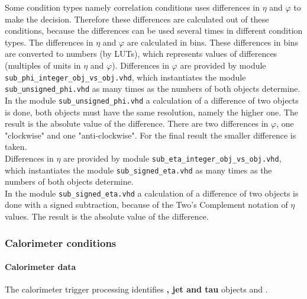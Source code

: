 Some condition types namely correlation conditions uses differences in $\eta$ and $\varphi$ to make the decision.
Therefore these differences are calculated out of these conditions, because the differences can be used several times in different condition types.
The differences in $\eta$ and $\varphi$ are calculated in bins. These differences in bins are converted to numbers (by LUTs),
which represents values of differences (multiples of units in $\eta$ and $\varphi$).
Differences in $\varphi$ are provided by module \texttt{sub\_phi\_integer\_obj\_vs\_obj.vhd}, which instantiates the module \texttt{sub\_unsigned\_phi.vhd} as many times as
the numbers of both objects determine.\\
In the module \texttt{sub\_unsigned\_phi.vhd} a calculation of a difference of two objects is done, both objects must have the same resolution, namely the higher one.
The result is the absolute value of the difference.
There are two differences in $\varphi$, one "clockwise" and one "anti-clockwise". For the final result the smaller difference is taken.\\
Differences in $\eta$ are provided by module \texttt{sub\_eta\_integer\_obj\_vs\_obj.vhd}, which instantiates the module \texttt{sub\_signed\_eta.vhd} as many times as
the numbers of both objects determine.\\
In the module \texttt{sub\_signed\_eta.vhd} a calculation of a difference of two objects is done with a signed subtraction, because of the Two's Complement notation of $\eta$ values.
The result is the absolute value of the difference. 

\subsubsection{Calorimeter conditions}
\label{sec:gtl:calorimeter_conditions}

\paragraph{Calorimeter data}
\label{sec:gtl:calorimeter_data}

The calorimeter trigger processing identifies \textbf{\egamma, jet and tau} objects and \textbf{\esums}.\\

